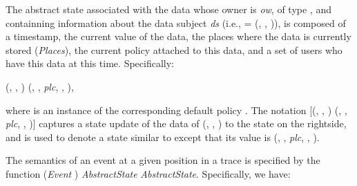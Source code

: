 \documentclass[a4paper]{article}
\begin{document}
The abstract state associated with the data  whose owner is \textit{ow}, of type , and containning information about the data subject \textit{ds} (i.e.,  = (, , )), is composed of a timestamp, the current value of the data, the places where the data is currently stored (\textit{Places}), the current policy attached to this data, and a set of users who have this data at this time. Specifically:  

\begin{center} 
(, , )  (, , \textit{plc}, , ), 
\end{center} 

where  is an instance of the corresponding default policy . The notation [(, , )  (, , \textit{plc}, , )] captures a state update of the data of (, , ) to the state on the rightside, and is 
used to denote a state  similar to  except that its value is  
(, , \textit{plc}, , ).  

The semantics of an event at a given 
position  in a trace is specified by the function  (\textit{Event}  )  
\textit{AbstractState}  \textit{AbstractState}. Specifically, we have:  
\end{document}
